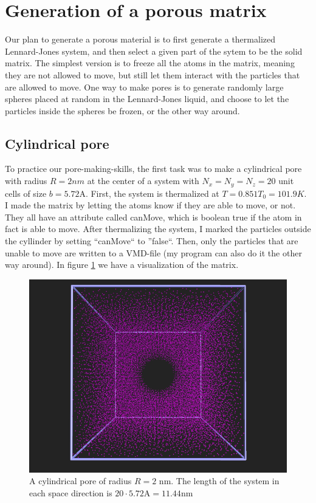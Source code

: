 \section{Generation of a porous matrix}
Our plan to generate a porous material is to first generate a thermalized Lennard-Jones system, and then select a given part of the sytem to be the solid matrix. The simplest version is to freeze all the atoms in the matrix, 
meaning they are not allowed to move, but still let them interact with the particles that are allowed to move. One way to make pores is to generate randomly large spheres placed at random in the Lennard-Jones liquid,
and choose to let the particles inside the spheres be frozen, or the other way around.
\subsection{Cylindrical pore}
To practice our pore-making-skills, the first task was to make a cylindrical pore with radius $R=2nm$ at the center of a system with $N_x=N_y=N_z= 20$ unit cells of size $b=5.72 $A. First, the system
is thermalized at $T = 0.851T_0 = 101.9K$. I made the matrix by letting the atoms know if they are able to move, or not. They all have an attribute called canMove, which is boolean true if the atom in fact is able to move.
After thermalizing the system, I marked the particles outside the cyllinder by setting ``canMove`` to ''false``. Then, only the particles that are unable to move are written to a VMD-file (my program can also do it the other way around).
In figure \ref{cyllinder} we have a visualization of the matrix.
\begin{figure}[H]
 \centering
 \includegraphics[width=12 cm]{./figures/cyllindircal_pore.png}
 \caption{A cylindrical pore of radius $R = 2$ nm. The length of the system in each space direction is $20\cdot 5.72\text{A} = 11.44 $nm}
 \label{cyllinder}
\end{figure}

